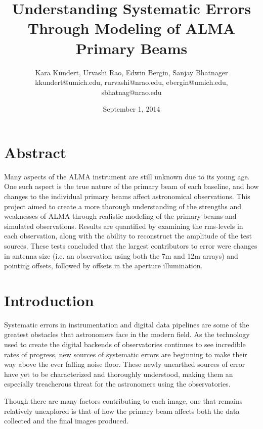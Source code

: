 \documentclass[11pt]{article}
\makeatletter
\newcommand{\thetitle}{Understanding Systematic Errors Through Modeling of ALMA 
Primary Beams}
\newcommand{\theauthor}{Kara Kundert, Urvashi Rao, Edwin Bergin, Sanjay 
Bhatnager}
\newcommand{\theauthorsemail}{kkundert@umich.edu, rurvashi@nrao.edu, 
ebergin@umich.edu, sbhatnag@nrao.edu}
\newcommand{\thedate}{September 1, 2014}
\makeatother
\begin{document}
\title{
    \sffamily\bfseries\huge
    \thetitle \\
}
\author{
    \sffamily\theauthor \\
    \sffamily\theauthorsemail \\
}
\date{\thedate}
\maketitle
\sloppy

\section{Abstract}

Many aspects of the ALMA instrument are still unknown due to its young age.
One such aspect is the true nature of the primary beam of each baseline, and
how changes to the individual primary beams affect astronomical
observations. This project aimed to create a more thorough
understanding of the strengths and weaknesses of ALMA through realistic
modeling of the primary beams and simulated observations. Results are
quantified by examining the rms-levels in each observation, along with the
ability to reconstruct the amplitude of the test sources. These tests
concluded that the largest contributors to error were changes in antenna
size (i.e. an observation using both the 7m and 12m arrays) and pointing
offsets, followed by offsets in the aperture illumination.

\section{Introduction}

Systematic errors in instrumentation and digital data pipelines are some of the 
greatest obstacles that astronomers face in the modern field. As the technology 
used to create the digital backends of observatories continues to see 
incredible rates of progress, new sources of systematic errors are beginning to 
make their way above the ever falling noise floor. These newly unearthed 
sources of error have yet to be characterized and thoroughly understood, making 
them an especially treacherous threat for the astronomers using the 
observatories.

Though there are many factors contributing to each image, one that remains 
relatively unexplored is that of how the primary beam affects both the data 
collected and the final images produced.
\end{document}
